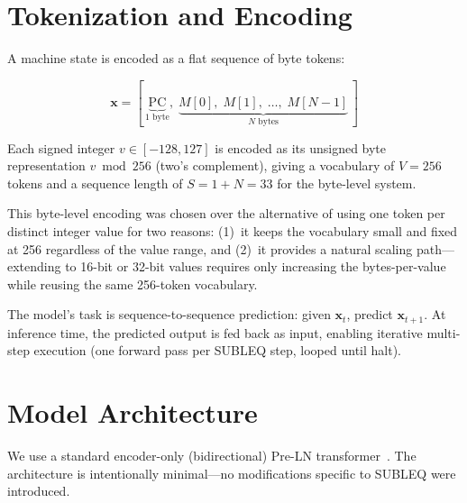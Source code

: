 \documentclass[11pt,a4paper]{article}
\begin{document}
\section{Tokenization and Encoding}
\label{sec:encoding}

A machine state is encoded as a flat sequence of byte tokens:

\begin{equation}
  \mathbf{x} = [\,\underbrace{\mathrm{PC}}_{\text{1 byte}},\; \underbrace{M[0],\; M[1],\; \ldots,\; M[N{-}1]}_{\text{$N$ bytes}}\,]
\end{equation}

Each signed integer $v \in [-128, 127]$ is encoded as its unsigned byte representation $v \bmod 256$ (two's complement), giving a vocabulary of $V = 256$ tokens and a sequence length of $S = 1 + N = 33$ for the byte-level system.

This byte-level encoding was chosen over the alternative of using one token per distinct integer value for two reasons: (1)~it keeps the vocabulary small and fixed at 256 regardless of the value range, and (2)~it provides a natural scaling path---extending to 16-bit or 32-bit values requires only increasing the bytes-per-value while reusing the same 256-token vocabulary.

The model's task is sequence-to-sequence prediction: given $\mathbf{x}_t$, predict $\mathbf{x}_{t+1}$.
At inference time, the predicted output is fed back as input, enabling iterative multi-step execution (one forward pass per SUBLEQ step, looped until halt).

\section{Model Architecture}
\label{sec:architecture}

We use a standard encoder-only (bidirectional) Pre-LN transformer~\cite{xiong2020layer}.
The architecture is intentionally minimal---no modifications specific to SUBLEQ were introduced.
\end{document}
